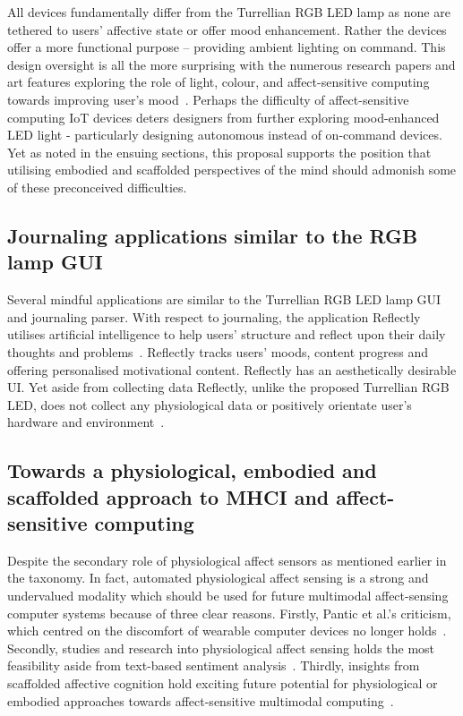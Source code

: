 \documentclass{sigchi}
\begin{document}
All devices fundamentally differ from the Turrellian RGB LED lamp as none are tethered to users’ affective state or offer mood enhancement. Rather the devices offer a more functional purpose – providing ambient lighting on command. This design oversight is all the more surprising with the numerous research papers and art features exploring the role of light, colour, and affect-sensitive computing towards improving user’s mood~\cite{lee2019effects, wardono2012effects, yang2015lighting}. Perhaps the difficulty of affect-sensitive computing IoT devices deters designers from further exploring mood-enhanced LED light - particularly designing autonomous instead of on-command devices. Yet as noted in the ensuing sections, this proposal supports the position that utilising embodied and scaffolded perspectives of the mind should admonish some of these preconceived difficulties. 

\subsection{Journaling applications similar to the RGB lamp GUI}

Several mindful applications are similar to the Turrellian RGB LED lamp GUI and journaling parser. With respect to journaling, the application Reflectly utilises artificial intelligence to help users’ structure and reflect upon their daily thoughts and problems~\cite{Reflectly01}. Reflectly tracks users’ moods, content progress and offering personalised motivational content. Reflectly has an aesthetically desirable UI. Yet aside from collecting data Reflectly, unlike the proposed Turrellian RGB LED, does not collect any physiological data or positively orientate user’s hardware and environment~\cite{Reflectly01}.

\subsection{Towards a physiological, embodied and scaffolded approach to MHCI and affect-sensitive computing}

Despite the secondary role of physiological affect sensors as mentioned earlier in the taxonomy. In fact, automated physiological affect sensing is a strong and undervalued modality which should be used for future multimodal affect-sensing computer systems because of three clear reasons. Firstly, Pantic et al.’s criticism, which centred on the discomfort of wearable computer devices no longer holds~\cite{pantic2008human, pantic2003toward, 6634207}. Secondly, studies and research into physiological affect sensing holds the most feasibility aside from text-based sentiment analysis~\cite{goshvarpour2017fusion, goshvarpour2017indices, goshvarpour2017discrimination}. Thirdly, insights from scaffolded affective cognition hold exciting future potential for physiological or embodied approaches towards affect-sensitive multimodal computing~\cite{colombetti2015scaffoldings}. 
\end{document}
